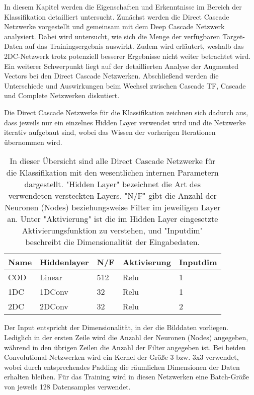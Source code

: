 In diesem Kapitel werden die Eigenschaften und Erkenntnisse im Bereich der Klassifikation detailliert untersucht. Zunächst werden die Direct 
Cascade Netzwerke vorgestellt und gemeinsam mit dem Deep Cascade Netzwerk analysiert. Dabei wird untersucht, wie sich die Menge der verfügbaren 
Target-Daten auf das Trainingsergebnis auswirkt. Zudem wird erläutert, weshalb das 2DC-Netzwerk trotz potenziell besserer Ergebnisse nicht weiter 
betrachtet wird. Ein weiterer Schwerpunkt liegt auf der detaillierten Analyse der Augmented Vectors bei den Direct Cascade Netzwerken. 
Abschließend werden die Unterschiede und Auswirkungen beim Wechsel zwischen Cascade TF, Cascade und Complete Netzwerken diskutiert.

Die Direct Cascade Netzwerke für die Klassifikation zeichnen sich dadurch aus, dass jeweils nur ein einzelnes Hidden Layer verwendet wird und die 
Netzwerke iterativ aufgebaut sind, wobei das Wissen der vorherigen Iterationen übernommen wird.

\begin{table}[h!]
    \centering    
    \begin{tabular}{l|l|l|l|l}
        \textbf{Name} & \textbf{Hiddenlayer} & \textbf{N/F} & \textbf{Aktivierung} & \textbf{Inputdim} \\
        \hline
        COD & Linear & 512 & Relu & 1 \\
        1DC & 1DConv & 32 & Relu & 1 \\
        2DC & 2DConv & 32 & Relu & 2
    \end{tabular}
    \caption{\small{In dieser Übersicht sind alle Direct Cascade Netzwerke für die Klassifikation mit den wesentlichen internen Parametern 
    dargestellt. "Hidden Layer" bezeichnet die Art des verwendeten versteckten Layers. "N/F" gibt die Anzahl der Neuronen (Nodes) beziehungsweise 
    Filter im jeweiligen Layer an. Unter "Aktivierung" ist die im Hidden Layer eingesetzte Aktivierungsfunktion zu verstehen, und "Inputdim" 
    beschreibt die Dimensionalität der Eingabedaten.}}
        \label{tab:classvor}
\end{table}

Der Input entspricht der Dimensionalität, in der die Bilddaten vorliegen. Lediglich in der ersten Zeile wird die Anzahl der Neuronen (Nodes) 
angegeben, während in den übrigen Zeilen die Anzahl der Filter angegeben ist. Bei beiden Convolutional-Netzwerken wird ein Kernel der Größe 3 
bzw. 3x3 verwendet, wobei durch entsprechendes Padding die räumlichen Dimensionen der Daten erhalten bleiben. Für das Training wird in diesen 
Netzwerken eine Batch-Größe von jeweils 128 Datensamples verwendet.
